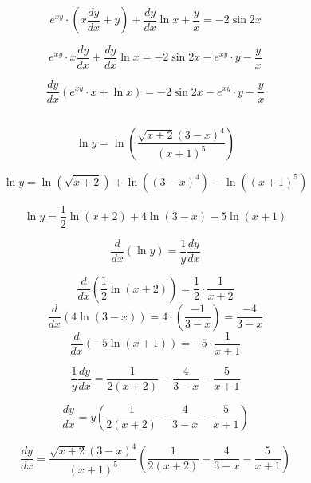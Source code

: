 \documentclass{article}
\begin{document}
\[
e^{xy} \cdot (x \frac{dy}{dx} + y) + \frac{dy}{dx} \ln x + \frac{y}{x} = -2 \sin 2x
\]


\[
e^{xy} \cdot x \frac{dy}{dx} + \frac{dy}{dx} \ln x = -2 \sin 2x - e^{xy} \cdot y - \frac{y}{x}
\]

\[
\frac{dy}{dx} \left( e^{xy} \cdot x + \ln x \right) = -2 \sin 2x - e^{xy} \cdot y - \frac{y}{x}
\]



\subsection{}

\[
\ln y = \ln \left( \frac{\sqrt{x+2}(3-x)^4}{(x+1)^5} \right)
\]

\[
\ln y = \ln \left( \sqrt{x+2} \right) + \ln \left( (3-x)^4 \right) - \ln \left( (x+1)^5 \right)
\]

\[
\ln y = \frac{1}{2} \ln (x+2) + 4 \ln (3-x) - 5 \ln (x+1)
\]

\[
\frac{d}{dx} (\ln y) = \frac{1}{y} \frac{dy}{dx}
\]

\[
\frac{d}{dx} \left( \frac{1}{2} \ln (x+2) \right) = \frac{1}{2} \cdot \frac{1}{x+2}
\]
\[
\frac{d}{dx} \left( 4 \ln (3-x) \right) = 4 \cdot \left( \frac{-1}{3-x} \right) = \frac{-4}{3-x}
\]
\[
\frac{d}{dx} \left( -5 \ln (x+1) \right) = -5 \cdot \frac{1}{x+1}
\]

\[
\frac{1}{y} \frac{dy}{dx} = \frac{1}{2(x+2)} - \frac{4}{3-x} - \frac{5}{x+1}
\]

\[
\frac{dy}{dx} = y \left( \frac{1}{2(x+2)} - \frac{4}{3-x} - \frac{5}{x+1} \right)
\]

\[
\frac{dy}{dx} = \frac{\sqrt{x+2}(3-x)^4}{(x+1)^5} \left( \frac{1}{2(x+2)} - \frac{4}{3-x} - \frac{5}{x+1} \right)
\]

\end{document}
